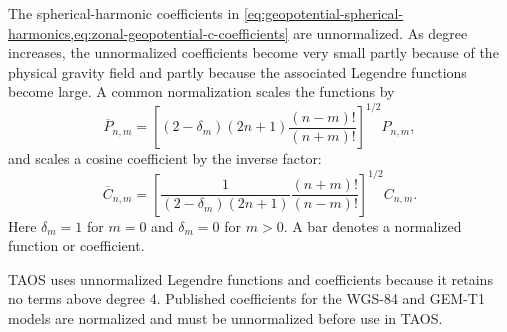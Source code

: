 
The spherical-harmonic coefficients in
\cref{eq:geopotential-spherical-harmonics,eq:zonal-geopotential-c-coefficients}
are unnormalized. As degree increases, the unnormalized coefficients become very
small partly because of the physical gravity field and partly because the associated
Legendre functions become large. A common normalization scales the functions by
\begin{equation}
  \overline{P}_{n,m}
  =\left[(2-\delta_m)(2n+1)
    \frac{(n-m)!}{(n+m)!}\right]^{1/2}P_{n,m},
  \label{eq:normalized-legendre-function}
\end{equation}
and scales a cosine coefficient by the inverse factor:
\begin{equation}
  \overline{C}_{n,m}
  =\left[\frac{1}{(2-\delta_m)(2n+1)}
    \frac{(n+m)!}{(n-m)!}\right]^{1/2}C_{n,m}.
  \label{eq:normalized-gravity-coefficient}
\end{equation}
Here $\delta_m=1$ for $m=0$ and $\delta_m=0$ for $m>0$. A bar denotes a
normalized function or coefficient.

TAOS uses unnormalized Legendre functions and coefficients because it retains no
terms above degree 4. Published coefficients for the WGS-84 and
GEM-T1 models are normalized and must be unnormalized before use
in TAOS.



